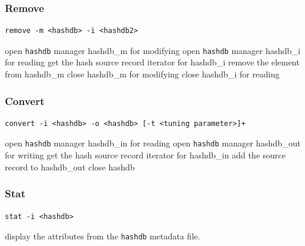 \documentclass[10pt,twoside]{article}
\newcommand{\hdb}{\texttt{hashdb}\xspace}
\begin{document}
\subsubsection{Remove}
\begin{small}
\begin{verbatim}
remove -m <hashdb> -i <hashdb2>
\end{verbatim}
\end{small}
\begin{algorithmic}
\STATE open \hdb manager hashdb\_m for modifying
\STATE open \hdb manager hashdb\_i for reading
\STATE get the hash source record iterator for hashdb\_i
  \STATE remove the element from hashdb\_m
\ENDFOR
\STATE close hashdb\_m for modifying
\STATE close hashdb\_i for reading
\end{algorithmic}

\subsubsection{Convert}
\begin{small}
\begin{verbatim}
convert -i <hashdb> -o <hashdb> [-t <tuning parameter>]+
\end{verbatim}
\end{small}
\begin{algorithmic}
\STATE open \hdb manager hashdb\_in for reading
\STATE open \hdb manager hashdb\_out for writing
\STATE get the hash source record iterator for hashdb\_in
  \STATE add the source record to hashdb\_out
\ENDFOR
\STATE close hashdb
\end{algorithmic}

\subsubsection{Stat}
\begin{small}
\begin{verbatim}
stat -i <hashdb>
\end{verbatim}
\end{small}
\begin{algorithmic}
\STATE display the attributes from the \hdb metadata file.
\end{algorithmic}
\end{document}
